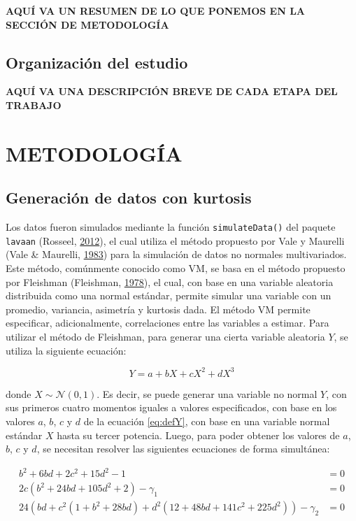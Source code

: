 \documentclass[
]{article}
\begin{document}
\textbf{AQUÍ VA UN RESUMEN DE LO QUE PONEMOS EN LA SECCIÓN DE
METODOLOGÍA}

\subsection{Organización del estudio}

\textbf{AQUÍ VA UNA DESCRIPCIÓN BREVE DE CADA ETAPA DEL TRABAJO}

\newpage

\section{METODOLOGÍA}

\subsection{Generación de datos con kurtosis}

Los datos fueron simulados mediante la función \texttt{simulateData()}
del paquete \texttt{lavaan} (Rosseel,
\protect\hyperlink{ref-lavaan}{2012}), el cual utiliza el método
propuesto por Vale y Maurelli (Vale \& Maurelli,
\protect\hyperlink{ref-Vale1983}{1983}) para la simulación de datos no
normales multivariados. Este método, comúnmente conocido como VM, se
basa en el método propuesto por Fleishman (Fleishman,
\protect\hyperlink{ref-Fleishman1978}{1978}), el cual, con base en una
variable aleatoria distribuida como una normal estándar, permite simular
una variable con un promedio, variancia, asimetría y kurtosis dada. El
método VM permite especificar, adicionalmente, correlaciones entre las
variables a estimar. Para utilizar el método de Fleishman, para generar
una cierta variable aleatoria \(Y\), se utiliza la siguiente ecuación:

\begin{equation} \label{eq:defY}
  Y = a + bX + cX^2 + d X^3
\end{equation}

donde \(X \sim \mathcal{N} (0,1)\). Es decir, se puede generar una
variable no normal \(Y\), con sus primeros cuatro momentos iguales a
valores especificados, con base en los valores \(a\), \(b\), \(c\) y
\(d\) de la ecuación \ref{eq:defY}, con base en una variable normal
estándar \(X\) hasta su tercer potencia. Luego, para poder obtener los
valores de \(a\), \(b\), \(c\) y \(d\), se necesitan resolver las
siguientes ecuaciones de forma simultánea:

\begin{align*}
  b^2 + 6bd + 2c^2 + 15d^2 -1 & = 0 \\
  2c (b^2 + 24bd + 105d^2 + 2) - \gamma_1 & = 0 \\
  24 \left(bd + c^2 (1 + b^2 + 28bd) + d^2 (12 + 48bd + 141c^2 + 225d^2) \right) - \gamma_2 & = 0
\end{align*}
\end{document}

